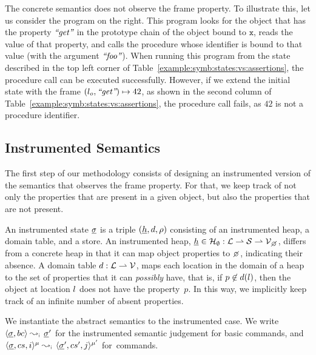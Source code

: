 The \jsil concrete semantics does not observe the frame property. To illustrate this,
let us consider the program on the right. 
This program looks for the object that has the property $\text{{\it ``get''}}$ in the 
prototype chain of the object bound to $\mathtt{x}$, reads the value of that 
property, and calls the procedure whose identifier is bound to that value 
(with the argument $\text{{\it ``foo''}}$). 
When running this program from the state described in the top left corner of 
Table~\ref{example:symb:states:vs:assertions}, the procedure call can be executed 
successfully. However, if we extend the initial state with the frame $(l_o, \text{{\it ``get''}}) \mapsto 42$, 
as shown in the second column of Table~\ref{example:symb:states:vs:assertions}, the procedure 
call fails, as $42$ is not a procedure identifier. 

\vspace*{-0.2cm}
\subsection{\jsil Instrumented Semantics}\label{subsec:instrumented}

The first step of our methodology %
consists of designing an instrumented version of the semantics that observes the frame property. 
%
For that, we keep track of not only the properties that are present in a given object, but also the properties that are not present.

An instrumented state $\underline{\sigma}$ is a triple $(\underline{h}, d, \rho)$ consisting of an instrumented heap, 
a domain table, and a store. 
%
An instrumented heap, $\iheap \in \iheaps : \locs \partialmap \strings \partialmap \setext{\vals}{\none}$, 
differs from a concrete heap in that it can map object properties to $\none$, indicating their absence. 
%
A domain table $d : {\mathcal L} \rightharpoonup \mathcal{V}$, maps each location in the domain of a heap to the set 
of properties that it can \emph{possibly} have, that is, if $p \not\in d(l)$, then the object 
at location $l$ does not have the property~$p$. In this way, we implicitly keep track of an infinite number of absent properties.
%

We instantiate the abstract semantics to the instrumented case. 
We write $\absbsemrule{\istate, \bcmd}{\istate'}{\instrumented}$ for the instrumented semantic 
judgement for basic commands, and $\abssemrule{\istate, \cs, i}{\istate', \cs', j}{\mode}{\mode'}{\instrumented}$ 
for~commands. 

